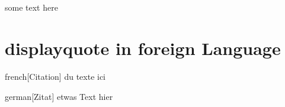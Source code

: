 \documentclass{article}
\begin{document}
\subsection{\languagename}
\begin{displayquote}[Citation]
some text here
\end{displayquote}

\section{displayquote in foreign Language}

\begin{foreigndisplayquote}{french}[Citation]
du texte ici
\end{foreigndisplayquote}

\begin{foreigndisplayquote}{german}[Zitat]
etwas Text hier
\end{foreigndisplayquote}
\end{document}
